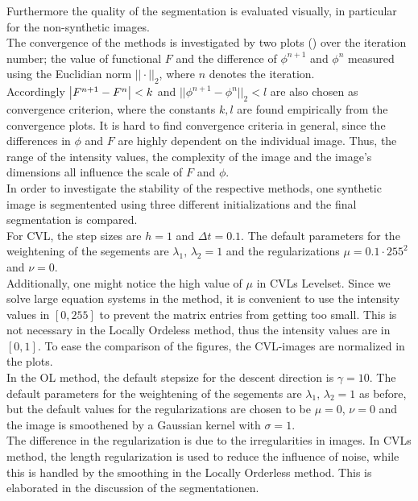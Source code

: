 Furthermore the quality of the segmentation is evaluated visually, in particular for the non-synthetic images.\\
The convergence of the methods is investigated by two plots () over the iteration number; the value of functional $F$ and the difference of $\phi^{n+1}$ and $\phi^n$ measured using the Euclidian norm $||\cdot||_2$, where $n$ denotes the iteration.\\
Accordingly $\left| {F^{n+1}-F^n} \right|<k$ and $||\phi^{n+1}-\phi^{n}||_2<l$ are also chosen as convergence criterion, where the constants $k,l$ are found empirically from the convergence plots. It is hard to find convergence criteria in general, since the differences in $\phi$ and $F$ are highly dependent on the individual image. Thus, the range of the intensity values, the complexity of the image and the image's dimensions all influence the scale of $F$ and $\phi$.\\
In order to investigate the stability of the respective methods, one synthetic image is segmentented using three different initializations and the final segmentation is compared.\\

For CVL, the step sizes are $h=1$ and $\Delta t=0.1$. The default parameters for the weightening of the segements are $\lambda_1,\,\lambda_2 = 1$ and the regularizations $\mu = 0.1\cdot 255^2$ and $\nu = 0$.\\
Additionally, one might notice the high value of $\mu$ in CVLs Levelset. Since we solve large equation systems in the method, it is convenient to use the intensity values in $[0,255]$ to prevent the matrix entries from getting too small. This is not necessary in the Locally Ordeless method, thus the intensity values are in $[0,1]$. To ease the comparison of the figures, the CVL-images are normalized in the plots.\\
In the OL method, the default stepsize for the descent direction is $\gamma = 10$. The default parameters for the weightening of the segements are $\lambda_1,\,\lambda_2 = 1$ as before, but the default values for the regularizations are chosen to be $\mu=0$, $\nu=0$ and the image is smoothened by a Gaussian kernel with $\sigma = 1$. \\
The difference in the regularization is due to the irregularities in images. In CVLs method, the length regularization is used to reduce the influence of noise, while this is handled by the smoothing in the Locally Orderless method. This is elaborated in the discussion of the segmentationen.\\

